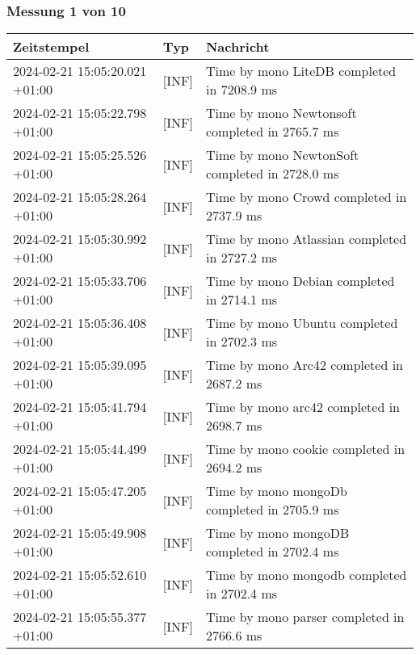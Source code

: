     \subsubsection*{Messung 1 von 10} \label{subsubsec:LiteDbMehrPaketeAlsDb1von10}
        {
            {\small
                \begin{tabularx}{\textwidth}{|l|l|X|}
                    \hline
                    \textbf{Zeitstempel} & \textbf{Typ} & \textbf{Nachricht} \\
                    \hline
                    \endhead
                    2024-02-21 15:05:20.021 +01:00 & [INF] & Time by mono LiteDB completed in 7208.9 ms \\
                    2024-02-21 15:05:22.798 +01:00 & [INF] & Time by mono Newtonsoft completed in 2765.7 ms \\
                    2024-02-21 15:05:25.526 +01:00 & [INF] & Time by mono NewtonSoft completed in 2728.0 ms \\
                    2024-02-21 15:05:28.264 +01:00 & [INF] & Time by mono Crowd completed in 2737.9 ms \\
                    2024-02-21 15:05:30.992 +01:00 & [INF] & Time by mono Atlassian completed in 2727.2 ms \\
                    2024-02-21 15:05:33.706 +01:00 & [INF] & Time by mono Debian completed in 2714.1 ms \\
                    2024-02-21 15:05:36.408 +01:00 & [INF] & Time by mono Ubuntu completed in 2702.3 ms \\
                    2024-02-21 15:05:39.095 +01:00 & [INF] & Time by mono Arc42 completed in 2687.2 ms \\
                    2024-02-21 15:05:41.794 +01:00 & [INF] & Time by mono arc42 completed in 2698.7 ms \\
                    2024-02-21 15:05:44.499 +01:00 & [INF] & Time by mono cookie completed in 2694.2 ms \\
                    2024-02-21 15:05:47.205 +01:00 & [INF] & Time by mono mongoDb completed in 2705.9 ms \\
                    2024-02-21 15:05:49.908 +01:00 & [INF] & Time by mono mongoDB completed in 2702.4 ms \\
                    2024-02-21 15:05:52.610 +01:00 & [INF] & Time by mono mongodb completed in 2702.4 ms \\
                    2024-02-21 15:05:55.377 +01:00 & [INF] & Time by mono parser completed in 2766.6 ms \\

\end{tabularx}}}
